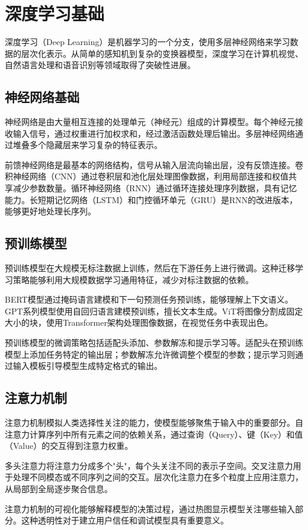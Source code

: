 \section{深度学习基础}\label{sec:ch2-deeplearning}

深度学习（Deep Learning）是机器学习的一个分支，使用多层神经网络来学习数据的层次化表示。从简单的感知机到复杂的变换器模型，深度学习在计算机视觉、自然语言处理和语音识别等领域取得了突破性进展。

\subsection{神经网络基础}\label{sec:ch2-nn}

神经网络是由大量相互连接的处理单元（神经元）组成的计算模型。每个神经元接收输入信号，通过权重进行加权求和，经过激活函数处理后输出。多层神经网络通过堆叠多个隐藏层来学习复杂的特征表示。

前馈神经网络是最基本的网络结构，信号从输入层流向输出层，没有反馈连接。卷积神经网络（CNN）通过卷积层和池化层处理图像数据，利用局部连接和权值共享减少参数数量。循环神经网络（RNN）通过循环连接处理序列数据，具有记忆能力。长短期记忆网络（LSTM）和门控循环单元（GRU）是RNN的改进版本，能够更好地处理长序列。

\subsection{预训练模型}\label{sec:ch2-pretraining}

预训练模型在大规模无标注数据上训练，然后在下游任务上进行微调。这种迁移学习策略能够利用大规模数据学习通用特征，减少对标注数据的依赖。

BERT模型通过掩码语言建模和下一句预测任务预训练，能够理解上下文语义。GPT系列模型使用自回归语言建模预训练，擅长文本生成。ViT将图像分割成固定大小的块，使用Transformer架构处理图像数据，在视觉任务中表现出色。

预训练模型的微调策略包括适配头添加、参数解冻和提示学习等。适配头在预训练模型上添加任务特定的输出层；参数解冻允许微调整个模型的参数；提示学习则通过输入模板引导模型生成特定格式的输出。

\subsection{注意力机制}\label{sec:ch2-attention}

注意力机制模拟人类选择性关注的能力，使模型能够聚焦于输入中的重要部分。自注意力计算序列中所有元素之间的依赖关系，通过查询（Query）、键（Key）和值（Value）的交互得到注意力权重。

多头注意力将注意力分成多个"头"，每个头关注不同的表示子空间。交叉注意力用于处理不同模态或不同序列之间的交互。层次化注意力在多个粒度上应用注意力，从局部到全局逐步聚合信息。

注意力机制的可视化能够解释模型的决策过程，通过热图显示模型关注哪些输入部分。这种透明性对于建立用户信任和调试模型具有重要意义。